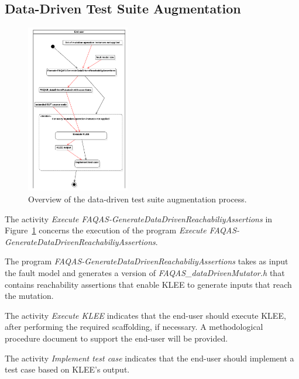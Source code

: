 \subsection{Data-Driven Test Suite Augmentation}

\begin{figure}[]
  \centering
	\includegraphics[width=0.4\textwidth]{images/png/Activity1!DataDrivenTestSuiteAugmentation_4.png}
      \caption{Overview of the data-driven test suite augmentation process.}
      \label{fig:process:dataDriven:augment}
\end{figure}

The activity \emph{Execute FAQAS-GenerateDataDrivenReachabiliyAssertions} in Figure~\ref{fig:process:dataDriven:augment} concerns the execution of the program \emph{Execute FAQAS-GenerateDataDrivenReachabiliyAssertions}.

The program \emph{FAQAS-GenerateDataDrivenReachabiliyAssertions} takes as input the fault model and generates a version of \emph{FAQAS\_dataDrivenMutator.h} that contains reachability assertions that enable KLEE to generate inputs that reach the mutation.

The activity \emph{Execute KLEE} indicates that the end-user should execute KLEE, after performing the required scaffolding, if necessary. A methodological procedure document to support the end-user will be provided.

The activity \emph{Implement test case} indicates that the end-user should implement a test case based on KLEE's output.


